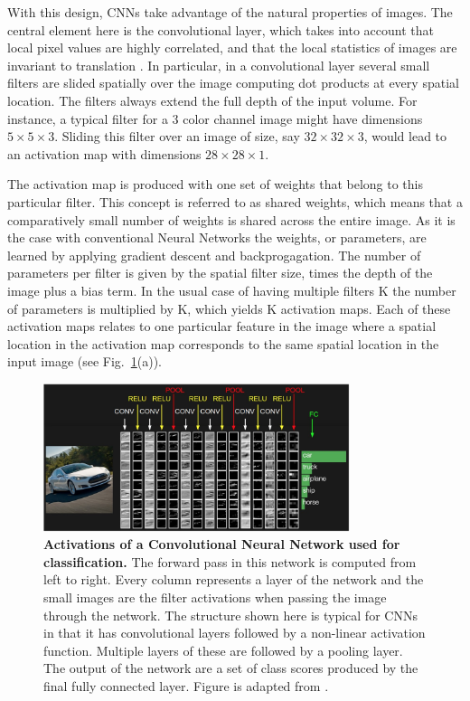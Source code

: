 With this design, CNNs take advantage of the natural properties of images. The central element here is the convolutional layer, which takes into account that local pixel values are highly correlated, and that the local statistics of images are invariant to translation \parencite{lawrence1997}. In particular, in a convolutional layer several small filters are slided spatially over the image computing dot products at every spatial location. The filters always extend the full depth of the input volume. For instance, a typical filter for a 3 color channel image might have dimensions $5 \times 5 \times 3$. Sliding this filter over an image of size, say  $32\times32\times3$, would lead to an activation map with dimensions $28\times28\times1$. 

The activation map is produced with one set of weights that belong to this particular filter. This concept is referred to as shared weights, which means that a comparatively small number of weights is shared across the entire image. As it is the case with conventional Neural Networks the weights, or parameters, are learned by applying gradient descent and backprogagation.  The number of parameters per filter is given by the spatial filter size, times the depth of the image plus a bias term. In the usual case of having multiple filters K the number of parameters is multiplied by K, which yields K activation maps. Each of these activation maps relates to one particular feature in the image where a spatial location in the activation map corresponds to the same spatial location in the input image (see Fig.~\ref{fig:convnet}(a)). 


\begin{figure}[h!]
	\centering
	\captionsetup{width=1\linewidth}
	\includegraphics[width=0.8\textwidth]{Figures/convnet.png}
	\caption{\textbf{Activations of a Convolutional Neural Network used for classification.} The forward pass in this network is computed from left to right. Every column represents a layer of the network and the small images are the filter activations when passing the image through the network. The structure shown here is typical for CNNs in that it has convolutional layers followed by a non-linear activation function. Multiple layers of these are followed by a pooling layer. The output of the network are a set of class scores produced by the final fully connected layer. Figure is adapted from \parencite{cs231}.}
	\label{fig:convnet}
\end{figure}

